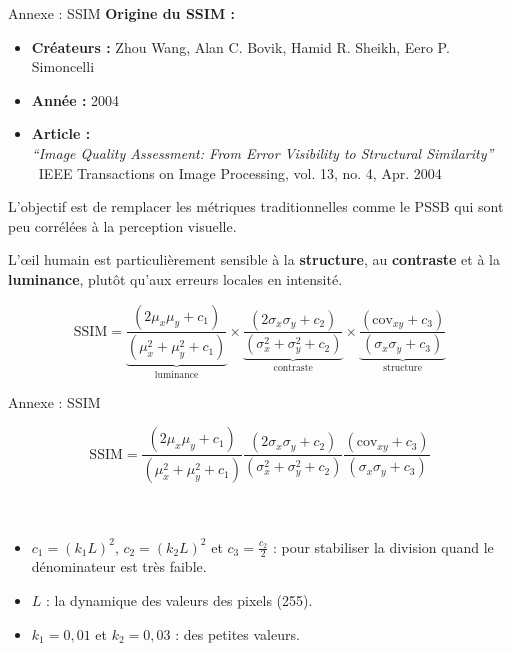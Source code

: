 \documentclass[xcolor=dvipsnames]{beamer}
\begin{document}
\begin{frame}{Annexe : SSIM}
    \scriptsize
    \textbf{Origine du SSIM :}
    \begin{itemize}
        \item \textbf{Créateurs :} Zhou Wang, Alan C. Bovik, Hamid R. Sheikh, Eero P. Simoncelli
        \item \textbf{Année :} 2004
        \item \textbf{Article :} \\
        \textit{“Image Quality Assessment: From Error Visibility to Structural Similarity”} \\
         \ IEEE Transactions on Image Processing, vol. 13, no. 4, Apr. 2004
    \end{itemize}

    \vspace{0.7cm}
    L'objectif est de remplacer les métriques traditionnelles comme le PSSB qui sont peu corrélées à la perception visuelle.
    
    \vspace{0.4cm}
    \begin{block}{}
    L'œil humain est particulièrement sensible à la \textbf{structure}, au \textbf{contraste} et à la \textbf{luminance}, plutôt qu'aux erreurs locales en intensité.
    \end{block}

    \[
        \text{SSIM} = 
        \underbrace{\frac{(2\mu_x\mu_y + c_1)}{(\mu_x^2 + \mu_y^2 + c_1)}}_{\text{luminance}}
        \times
        \underbrace{\frac{(2\sigma_x\sigma_y + c_2)}{(\sigma_x^2 + \sigma_y^2 + c_2)}}_{\text{contraste}}
        \times
        \underbrace{\frac{(\text{cov}_{xy} + c_3)}{(\sigma_x\sigma_y + c_3)}}_{\text{structure}}
    \]

\end{frame}



\begin{frame} {Annexe : SSIM}

    \[
    \text{SSIM} = \frac{(2\mu_x\mu_y + c_1)}{(\mu_x^2 + \mu_y^2 + c_1)}\frac{(2\sigma_x\sigma_y + c_2)}{(\sigma_x^2 + \sigma_y^2 + c_2)}\frac{(\text{cov}_{xy} + c_3)}{(\sigma_x\sigma_y + c_3)}
    \]
    \\ \ \\

    \begin{itemize}
        \item $c_1 = (k_1 L)^2$, $c_2 = (k_2 L)^2$ et $c_3 = \frac{c_2}{2}$ : pour stabiliser la division quand le dénominateur est très faible.
        \item $L$ : la dynamique des valeurs des pixels (255).
        \item $k_1 = 0,01$ et $k_2 = 0,03$ : des petites valeurs.
    \end{itemize}
\end{frame}
\end{document}
